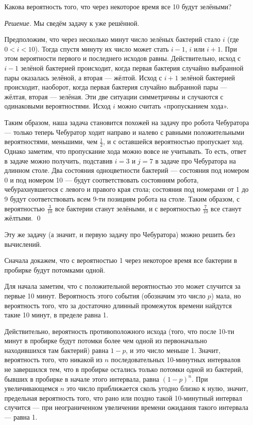 \documentclass{article}
\begin{document}
Какова вероятность того, что через некоторое время все 10 будут зелёными?

\medskip
\noindent\textit{Решение.}
Мы сведём задачу к уже решённой.

Предположим, что через несколько минут 
число зелёных бактерий стало $i$ (где $0<i<10$).
Тогда спустя минуту их число может стать $i-1$, $i$ или $i+1$.
При этом вероятности первого и последнего исходов равны.
Действительно, исход с $i-1$ зелёной бактерией происходит, когда первая
бактерия случайно выбранной пары оказалась зелёной, а вторая --- жёлтой.
Исход с $i+1$ зелёной бактерией происходит, наоборот, когда первая бактерия случайно выбранной пары --- жёлтая, вторая --- зелёная. Эти две ситуации симметричны и случаются с одинаковыми вероятностями.
Исход $i$ можно считать «пропусканием хода». 

Таким образом, наша задача становится похожей на задачу про робота Чебуратора --- только теперь Чебуратор ходит направо и налево с равными положительными вероятностями, меньшими, чем $\tfrac12$, и с оставшейся вероятностью пропускает ход.
Однако заметим, что пропускание хода можно вовсе не учитывать.
То есть, ответ в задаче можно получить, подставив $i=3$ и $j=7$ в задаче про Чебуратора на длинном столе. 
Два состояния одноцветности бактерий --- состояния под номером 0 и под номером 10 --- будут соответствовать состояниям робота, чебурахнувшегося с левого и правого края стола; состояния под номерами от 1 до 9 будут соответствовать всем 9-ти позициям робота на столе.
Таким образом, с вероятностью $\tfrac{3}{10}$ все бактерии станут зелёными, 
и с вероятностью $\tfrac{7}{10}$ все станут жёлтыми.
\qed
\medskip

Эту же задачу (а значит, и первую задачу про Чебуратора)
можно решить без вычислений.

Сначала докажем, что с вероятностью 1
через некоторое время все бактерии в пробирке будут потомками одной.

Для начала заметим, что с положительной вероятностью это может случится за первые 10 минут. 
Вероятность этого события (обозначим это число $p$) мала,
но вероятность того, что за достаточно длинный промежуток времени найдутся такие 10 минут, в пределе равна 1. 

Действительно, вероятность противоположного исхода (того, что после 10-ти минут в пробирке будут потомки более чем одной из первоначально находившихся там бактерий) равна $1-p$, и это число меньше 1. 
Значит, вероятность того, что никакой из $n$ последовательных 10-минутных интервалов не завершился тем, что в пробирке остались только потомки одной из бактерий, бывших в пробирке в начале этого интервала, равна $(1-p)^n$. 
При увеличивающемся $n$ это число приближается сколь угодно близко к нулю, значит, предельная вероятность того, что рано или поздно такой 10-минутный интервал случится --- при неограниченном увеличении времени ожидания такого интервала --- равна 1. 
\end{document}
